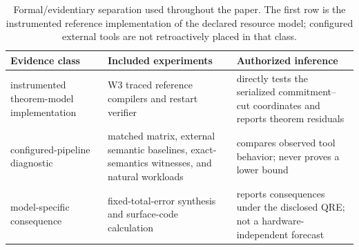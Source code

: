 \begin{table}[!t]
\centering
\small
\setlength{\tabcolsep}{4pt}
\begin{tabularx}{\textwidth}{@{}l X X@{}}
\toprule
Evidence class & Included experiments & Authorized inference \\
\midrule
instrumented theorem-model implementation & W3 traced reference compilers and restart verifier & directly tests the serialized commitment--cut coordinates and reports theorem residuals \\
configured-pipeline diagnostic & matched matrix, external semantic baselines, exact-semantics witnesses, and natural workloads & compares observed tool behavior; never proves a lower bound \\
model-specific consequence & fixed-total-error synthesis and surface-code calculation & reports consequences under the disclosed QRE; not a hardware-independent forecast \\
\bottomrule
\end{tabularx}
\caption{Formal/evidentiary separation used throughout the paper.  The first
row is the instrumented reference implementation of the declared resource
model; configured external tools are not retroactively placed in that class.}
\label{tab:evidence-classes}
\end{table}

